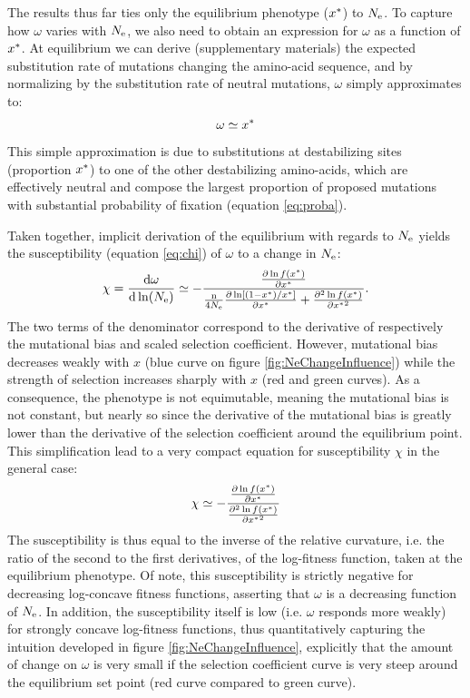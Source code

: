 \documentclass{MBE}%
\begin{document}
The results thus far ties only the equilibrium phenotype ($x^{*}$) to $N_{\mathrm{e}}$.
To capture how $\omega$ varies with $N_{\mathrm{e}}$, we also need to obtain an expression for $\omega$ as a function of $x^{*}$. 
At equilibrium we can derive (supplementary materials) the expected substitution rate of mutations changing the amino-acid sequence, and by normalizing by the substitution rate of neutral mutations, $\omega$ simply approximates to:
\begin{gather}
 \omega \simeq x\eq \label{eq:dnds}
\end{gather}
This simple approximation is due to substitutions at destabilizing sites (proportion $x^{*}$) to one of the other destabilizing amino-acids, which are effectively neutral and compose the largest proportion of proposed mutations with substantial probability of fixation (equation \ref{eq:proba}).

Taken together, implicit derivation of the equilibrium with regards to $N_{\mathrm{e}}$ yields the susceptibility (equation \ref{eq:chi}) of $\omega$ to a change in $N_{\mathrm{e}}$:
\begin{gather}
 \chi = \frac{ \mathrm{d} \omega}{\mathrm{d} \ln (N_{\mathrm{e}})} \simeq - \frac{\frac{ \partial \ln f(x^{*}) }{\partial {x^{*}}}}{\frac{\text{n}}{4 N_{\mathrm{e}}} \frac{\partial \ln [ (1 - x^{*}) / x^{*} ]}{\partial x^{*} } + \frac{ \partial^2 \ln f(x^{*}) }{\partial {x^{*}}^2}}.
\end{gather}
The two terms of the denominator correspond to the derivative of respectively the mutational bias and scaled selection coefficient.
However, mutational bias decreases weakly with $x$ (blue curve on figure \ref{fig:NeChangeInfluence}) while the strength of selection increases sharply with $x$ (red and green curves).
As a consequence, the phenotype is not equimutable, meaning the mutational bias is not constant, but nearly so since the derivative of the mutational bias is greatly lower than the derivative of the selection coefficient around the equilibrium point. 
This simplification lead to a very compact equation for susceptibility $\chi$ in the general case: 
\begin{gather}
\chi \simeq - \frac{\frac{ \partial \ln f(x^{*}) }{\partial {x^{*}}}}{\frac{ \partial^2 \ln f(x^{*}) }{\partial {x^{*}}^2}}
\end{gather}
The susceptibility is thus equal to the inverse of the relative curvature, i.e. the ratio of the second to the first derivatives, of the log-fitness function, taken at the equilibrium phenotype.
Of note, this susceptibility is strictly negative for decreasing log-concave fitness functions, asserting that $\omega$ is a decreasing function of $N_{\mathrm{e}}$.
In addition, the susceptibility itself is low (i.e. $\omega$ responds more weakly) for strongly concave log-fitness functions, thus quantitatively capturing the intuition developed in figure \ref{fig:NeChangeInfluence}, explicitly that the amount of change on $\omega$ is very small if the selection coefficient curve is very steep around the equilibrium set point (red curve compared to green curve).
\end{document}

